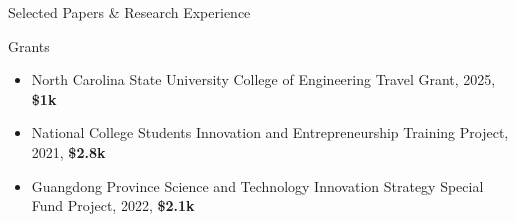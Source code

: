 \documentclass[]{mcdowellcv}
\begin{document}
\begin{cvsection}{Selected Papers \& Research Experience}
\end{cvsection}
\vspace*{-12pt}
\begin{cvsection}{Grants}
    \begin{cvsubsection}{}{}{}
        \begin{itemize}
            \item North Carolina State University College of Engineering Travel Grant, 2025, \textbf{\$1k}
            \item National College Students Innovation and Entrepreneurship Training Project, 2021, \textbf{\$2.8k}
            \item Guangdong Province Science and Technology Innovation Strategy Special Fund Project, 2022, \textbf{\$2.1k}
        \end{itemize}
    \end{cvsubsection}
\end{cvsection}
\end{document}
